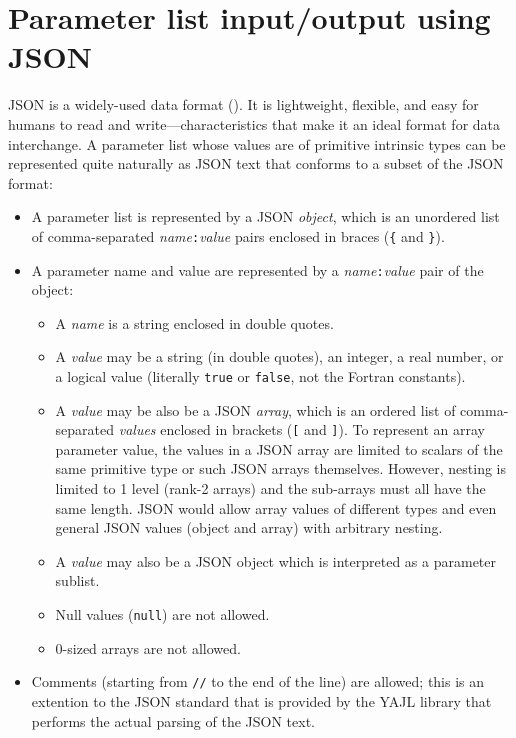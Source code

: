 \documentclass[11pt]{article}
\begin{document}
\section{Parameter list input/output using JSON}

JSON is a widely-used data format ().  It is
lightweight, flexible, and easy for humans to read and write---characteristics
that make it an ideal format for data interchange.  A parameter list whose
values are of primitive intrinsic types can be represented quite naturally
as JSON text that conforms to a subset of the JSON format:
\begin{itemize}\setlength{\itemsep}{0pt}
\item
  A parameter list is represented by a JSON \emph{object}, which is an
  unordered list of comma-separated \emph{name}\texttt{:}\emph{value}
  pairs enclosed in braces (\texttt{\{} and \texttt{\}}).
\item
  A parameter name and value are represented by a
  \emph{name}\texttt{:}\emph{value} pair of the object:
  \begin{itemize}\setlength{\itemsep}{0pt}
  \item
    A \emph{name} is a string enclosed in double quotes.
  \item
    A \emph{value} may be a string (in double quotes), an integer, a real
    number, or a logical value (literally \texttt{true} or \texttt{false},
    not the Fortran constants).
  \item
    A \emph{value} may be also be a JSON \emph{array}, which is an ordered
    list of comma-separated \emph{values} enclosed in brackets (\texttt{[}
    and \texttt{]}).  To represent an array parameter value, the values in
    a JSON array are limited to scalars of the same primitive type or
    such JSON arrays themselves.  However, nesting is limited to 1 level
    (rank-2 arrays) and the sub-arrays must all have the same length.
    JSON would allow array values of different types and even general JSON
    values (object and array) with arbitrary nesting.
  \item
    A \emph{value} may also be a JSON object which is interpreted as a
    parameter sublist.
  \item
    Null values (\texttt{null}) are not allowed.
  \item
    0-sized arrays are not allowed.
  \end{itemize}
\item
  Comments (starting from \texttt{//} to the end of the line) are allowed;
  this is an extention to the JSON standard that is provided by the YAJL
  library that performs the actual parsing of the JSON text.
\end{itemize}
\end{document}
